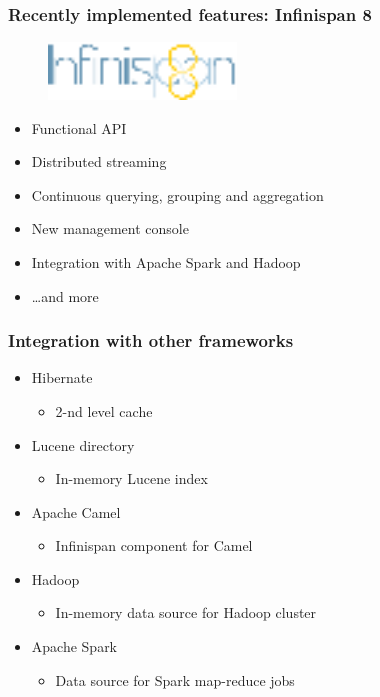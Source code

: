 \documentclass[10pt,utf8]{beamer}
\begin{document}
\begin{frame}
	\frametitle{Recently implemented features: Infinispan 8}
	\begin{figure}
		\centering
		\includegraphics[width=5cm]{./img/infinispan8.eps}
	\end{figure}
  \begin{itemize}
    \item Functional API
		\item Distributed streaming
		\item Continuous querying, grouping and aggregation
		\item New management console
		\item Integration with Apache Spark and Hadoop
		\item \dots and more
  \end{itemize}
\end{frame}

\begin{frame}
	\frametitle{Integration with other frameworks}
	\begin{itemize}
		\item Hibernate
		\begin{itemize}
			\item 2-nd level cache
		\end{itemize}
		\item Lucene directory
		\begin{itemize}
		 \item In-memory Lucene index 
		\end{itemize}
		\item Apache Camel
		\begin{itemize}
		 \item Infinispan component for Camel
		\end{itemize}
		\item Hadoop
		\begin{itemize}
			\item In-memory data source for Hadoop cluster
		\end{itemize}
		\item Apache Spark
		\begin{itemize}
			\item Data source for Spark map-reduce jobs
		\end{itemize}
	\end{itemize}
\end{frame}
\end{document}
